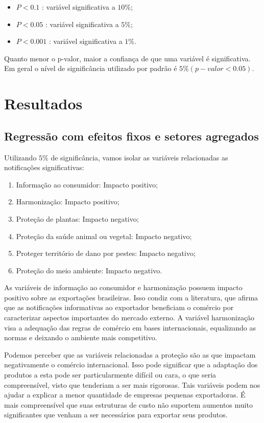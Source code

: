 \documentclass[12pt, a4paper]{article}
\begin{document}
\begin{itemize}
    \item $P < 0.1$ : variável significativa a $10\%$;
    \item $P < 0.05$ : variável significativa a $5\%$;
    \item $P < 0.001$ : variável significativa a $1\%$.
\end{itemize}

Quanto menor o p-valor, maior a confiança de que uma variável é significativa. Em geral o nível de significância utilizado por padrão é $5\% (p-valor < 0.05)$.


\newpage
\section{Resultados}

\subsection{Regressão com efeitos fixos e setores agregados}



 Utilizando $5\%$ de significância, vamos isolar as variáveis relacionadas as notificações significativas:

\begin{enumerate}
    \item Informação ao consumidor: Impacto positivo;
    \item Harmonização: Impacto positivo;
    \item Proteção de plantas: Impacto negativo;
    \item Proteção da saúde animal ou vegetal: Impacto negativo;
    \item Proteger território de dano por pestes: Impacto negativo;
    \item Proteção do meio ambiente: Impacto negativo.
\end{enumerate}

 As variáveis de informação ao consumidor e harmonização possuem impacto positivo sobre as exportações brasileiras. Isso condiz com a literatura, que afirma que as notificações informativas ao exportador beneficiam o comércio por caracterizar aspectos importantes do mercado externo. A variável harmonização visa a adequação das regras de comércio em bases internacionais, equalizando as normas e deixando o ambiente mais competitivo. 

Podemos perceber que as variáveis relacionadas a proteção são as que impactam negativamente o comércio internacional. Isso pode significar que a adaptação dos produtos a esta pode ser particularmente difícil ou cara, o que seria compreensível, visto que tenderiam a ser mais rigorosas. Tais variáveis podem nos ajudar a explicar a menor quantidade de empresas pequenas exportadoras. É mais compreensível que suas estruturas de custo não suportem aumentos muito significantes que venham a ser necessários para exportar seus produtos.




% 


\printbibliography
\end{document}
